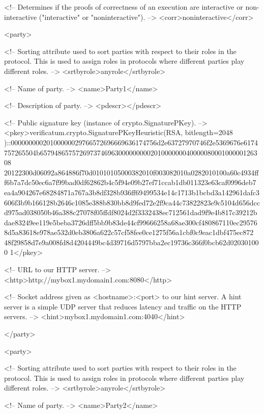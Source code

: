    <!-- Determines if the proofs of correctness of an execution are 
        interactive or non-interactive ("interactive" or 
        "noninteractive"). -->
   <corr>noninteractive</corr>

   <party>

      <!-- Sorting attribute used to sort parties with respect to their 
           roles in the protocol. This is used to assign roles in 
           protocols where different parties play different roles. -->
      <srtbyrole>anyrole</srtbyrole>

      <!-- Name of party. -->
      <name>Party1</name>

      <!-- Description of party. -->
      <pdescr></pdescr>

      <!-- Public signature key (instance of crypto.SignaturePKey). -->
      <pkey>verificatum.crypto.SignaturePKeyHeuristic(RSA, bitlength=2048
)::00000000020100000029766572696669636174756d2e63727970746f2e5369676e6174
757265504b657948657572697374696300000000020100000004000008000100000126308
20122300d06092a864886f70d01010105000382010f003082010a0282010100a60c4934ff
f6b7a7dc50ec6a7f99bad0df62862b4c5f94e09b27ef71ccab1db011323e63caf0996deb7
ea4a904267e68284871a767a3b8df328b936ff69499534e14c1713b1bcbd3a142961dafc3
606f3b9b166128b2646c1085e388b830bb8d9fed72e2f9ca44c73822823e9c5104d656dcc
d975ad038050b46a388c27078f05ffdf8024d2f3332438ec712561dad9f9e4b817c39212b
dae83249ee119e5beba3726dff5bb9b83de44cf99666258a68ae300cf480867110ec29576
8d5a83618e978ae532d0eb3806a622c57cf58fee0ce1275f56a1cbf0c9eac1dbf475ec872
48f29858d7e9a008fd8d4204449bc4d39716d5797bba2ec19736c366f0bcb62d020301000
1</pkey>

      <!-- URL to our HTTP server. -->
      <http>http://mybox1.mydomain1.com:8080</http>

      <!-- Socket address given as <hostname>:<port> to our hint server. 
           A hint server is a simple UDP server that reduces latency and 
           traffic on the HTTP servers. -->
      <hint>mybox1.mydomain1.com:4040</hint>

   </party>

   <party>

      <!-- Sorting attribute used to sort parties with respect to their 
           roles in the protocol. This is used to assign roles in 
           protocols where different parties play different roles. -->
      <srtbyrole>anyrole</srtbyrole>

      <!-- Name of party. -->
      <name>Party2</name>

